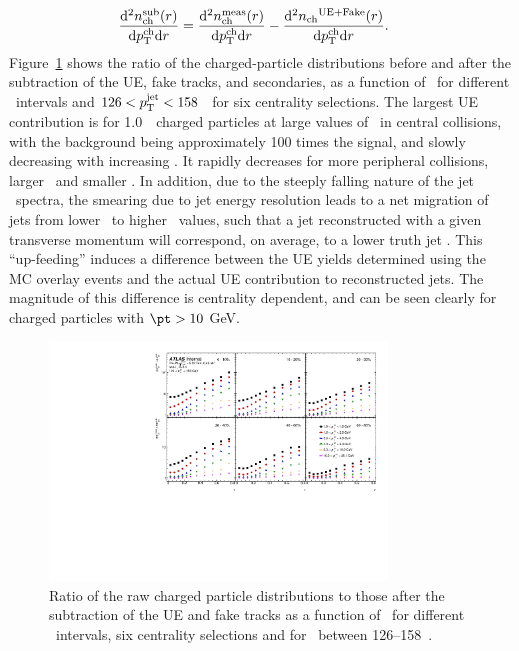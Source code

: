 \begin{align*}
\frac{\mathrm{d}^2 \mbox{$n_{\mathrm{ch}}^{\mathrm{sub}}$} (r) }{ \mathrm{d} \mbox{$p_{\mathrm{T}}^{\mathrm{ch}}$} \mathrm{d} r } &=  \frac{\mathrm{d}^2 \mbox{$n_{\mathrm{ch}}^{\mathrm{meas}}$}  (r) }{ \mathrm{d} \mbox{$p_{\mathrm{T}}^{\mathrm{ch}}$} \mathrm{d} r} -  \frac{ \mathrm{d}^2 \mbox{$n_{\mathrm{ch}}$}^{\mathrm{UE+Fake}}(r)  }{ \mathrm{d} \mbox{$p_{\mathrm{T}}^{\mathrm{ch}}$} \mathrm{d} r}.
\end{align*}
Figure~\ref{fig:UEsize} shows the ratio of the charged-particle distributions before and after the subtraction of the UE, fake tracks, and secondaries,
 as a function of \rvar\ for different \pttrk\ intervals and $126 < \mbox{$p_{\mathrm{T}}^{\mathrm{jet}}$} < 158$ \GeV\ for six centrality selections. The largest UE contribution is for 1.0~\GeV\ charged particles at large values of \rvar\ in central collisions, with the background being approximately 100 times the signal, and slowly decreasing with increasing \ptjet. It rapidly decreases for more peripheral collisions, larger \pttrk\ and smaller \rvar. In addition, due to the steeply falling nature of the jet \pt\ spectra, the smearing due to jet energy resolution leads to a net migration of jets from lower \ptjet\ to higher \ptjet\ values, such that a jet reconstructed with a given transverse momentum will correspond, on average, to a lower truth jet \pT.  This ``up-feeding'' induces a difference between the UE yields determined using the MC overlay events and the actual UE contribution to reconstructed jets. The magnitude of this difference is centrality dependent, and can be seen clearly for charged particles with $\pt > 10$ GeV.

\begin{figure}
\centerline{
 \includegraphics[width=0.8\textwidth]{figures/performance/UE_B2S_single_0} }
\caption{Ratio of the raw charged particle distributions to those after the subtraction of the UE and fake tracks as a function of \rvar\ for different \pttrk\ intervals, six centrality selections and for \ptjet\ between 126--158~\GeV.}
\label{fig:UEsize}
\end{figure}


